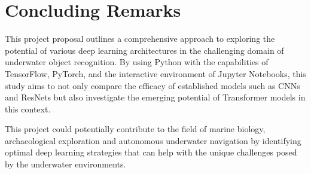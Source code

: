 \section{Concluding Remarks}

This project proposal outlines a comprehensive approach to exploring the
potential of various deep learning architectures in the challenging domain of
underwater object recognition.
By using Python with the capabilities of TensorFlow, PyTorch,
and the interactive environment of Jupyter Notebooks, this study aims to not
only compare the efficacy of established models such as CNNs and ResNets but
also investigate the emerging potential of Transformer models in this context.

This project could potentially contribute to the field of marine biology,
archaeological exploration and autonomous underwater navigation by identifying
optimal deep learning strategies that can help with the unique challenges
posed by the underwater environments.